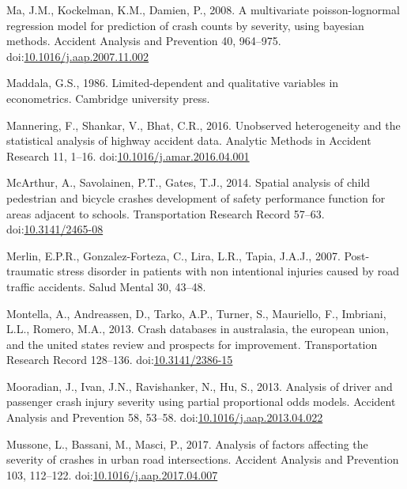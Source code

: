 \documentclass[]{elsarticle} %
\begin{document}
\leavevmode\hypertarget{ref-Ma2008multivariate}{}%
Ma, J.M., Kockelman, K.M., Damien, P., 2008. A multivariate
poisson-lognormal regression model for prediction of crash counts by
severity, using bayesian methods. Accident Analysis and Prevention 40,
964--975.
doi:\href{https://doi.org/10.1016/j.aap.2007.11.002}{10.1016/j.aap.2007.11.002}

\leavevmode\hypertarget{ref-Maddala1986limited}{}%
Maddala, G.S., 1986. Limited-dependent and qualitative variables in
econometrics. Cambridge university press.

\leavevmode\hypertarget{ref-Mannering2016unobserved}{}%
Mannering, F., Shankar, V., Bhat, C.R., 2016. Unobserved heterogeneity
and the statistical analysis of highway accident data. Analytic Methods
in Accident Research 11, 1--16.
doi:\href{https://doi.org/10.1016/j.amar.2016.04.001}{10.1016/j.amar.2016.04.001}

\leavevmode\hypertarget{ref-McArthur2014spatial}{}%
McArthur, A., Savolainen, P.T., Gates, T.J., 2014. Spatial analysis of
child pedestrian and bicycle crashes development of safety performance
function for areas adjacent to schools. Transportation Research Record
57--63. doi:\href{https://doi.org/10.3141/2465-08}{10.3141/2465-08}

\leavevmode\hypertarget{ref-Merlin2007stress}{}%
Merlin, E.P.R., Gonzalez-Forteza, C., Lira, L.R., Tapia, J.A.J., 2007.
Post-traumatic stress disorder in patients with non intentional injuries
caused by road traffic accidents. Salud Mental 30, 43--48.

\leavevmode\hypertarget{ref-Montella2013crash}{}%
Montella, A., Andreassen, D., Tarko, A.P., Turner, S., Mauriello, F.,
Imbriani, L.L., Romero, M.A., 2013. Crash databases in australasia, the
european union, and the united states review and prospects for
improvement. Transportation Research Record 128--136.
doi:\href{https://doi.org/10.3141/2386-15}{10.3141/2386-15}

\leavevmode\hypertarget{ref-Mooradian2013analysis}{}%
Mooradian, J., Ivan, J.N., Ravishanker, N., Hu, S., 2013. Analysis of
driver and passenger crash injury severity using partial proportional
odds models. Accident Analysis and Prevention 58, 53--58.
doi:\href{https://doi.org/10.1016/j.aap.2013.04.022}{10.1016/j.aap.2013.04.022}

\leavevmode\hypertarget{ref-Mussone2017analysis}{}%
Mussone, L., Bassani, M., Masci, P., 2017. Analysis of factors affecting
the severity of crashes in urban road intersections. Accident Analysis
and Prevention 103, 112--122.
doi:\href{https://doi.org/10.1016/j.aap.2017.04.007}{10.1016/j.aap.2017.04.007}
\end{document}
